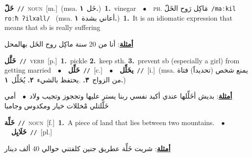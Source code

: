 \documentclass[10pt,a4paper,twoside]{article} %
\begin{document}
\begin{multicols}{2}
{\setlength\topsep{0pt}\textbf{\foreignlanguage{arabic}{خَلّ}}\ {\color{gray}\texttt{//}\color{black}}\ \textsc{noun}\ [m.]\ \color{gray}(msa. \foreignlanguage{arabic}{خَل}~\foreignlanguage{arabic}{\textbf{١.}})\color{black}\ \textbf{1.}~vinegar\ \ $\bullet$\ \ \textsc{ph.} \color{gray} \foreignlanguage{arabic}{مَاكِل رَوح الخَلّ}\color{black}\ {\color{gray}\texttt{/{\sffamily maːkil roːħ ʔilxall}/}\color{black}}\ \color{gray} (msa. \foreignlanguage{arabic}{أعاني بشدة}~\foreignlanguage{arabic}{\textbf{١.}})\color{black}\ \textbf{1.}~It is an idiomatic expression that means that sb is really suffering\  \begin{flushright}\color{gray}\foreignlanguage{arabic}{\textbf{\underline{\foreignlanguage{arabic}{أمثلة}}}: أنا من 20 سنة ماكِل روح الخَل بهالمحل}\end{flushright}\color{black}} \vspace{2mm}

{\setlength\topsep{0pt}\textbf{\foreignlanguage{arabic}{خَلَّل}}\ {\color{gray}\texttt{//}\color{black}}\ \textsc{verb}\ [p.]\ \textbf{1.}~pickle  \textbf{2.}~keep sth.  \textbf{3.}~prevent sb (especially a girl) from getting married\ \ $\bullet$\ \ \setlength\topsep{0pt}\textbf{\foreignlanguage{arabic}{خَلِّل}}\ {\color{gray}\texttt{//}\color{black}}\ [c.]\ \ $\bullet$\ \ \setlength\topsep{0pt}\textbf{\foreignlanguage{arabic}{يخَلِّل}}\ {\color{gray}\texttt{//}\color{black}}\ [i.]\ \color{gray}(msa. \foreignlanguage{arabic}{يمنع شخص (تحديداََ) فتاة من الزواج}~\foreignlanguage{arabic}{\textbf{٣.}}  .\foreignlanguage{arabic}{يحتفظ بالشيء}~\foreignlanguage{arabic}{\textbf{٢.}}  \foreignlanguage{arabic}{يُخَلِّل}~\foreignlanguage{arabic}{\textbf{١.}})\color{black}\  \begin{flushright}\color{gray}\foreignlanguage{arabic}{\textbf{\underline{\foreignlanguage{arabic}{أمثلة}}}: بديش أخَلِّلها عندي أكيد نفسي ربنا يستر عليها وتججوز وتجيب ولاد\ $\bullet$\ \  أمي خَلَّلتلي مْخللات خيار ومكدوس وجامبا}\end{flushright}\color{black}} \vspace{2mm}

{\setlength\topsep{0pt}\textbf{\foreignlanguage{arabic}{خَلِّة}}\ {\color{gray}\texttt{//}\color{black}}\ \textsc{noun}\ [f.]\ \textbf{1.}~A piece of land that lies between two mountains.\ \ $\bullet$\ \ \setlength\topsep{0pt}\textbf{\foreignlanguage{arabic}{خَلَايِل}}\ {\color{gray}\texttt{//}\color{black}}\ [pl.]\  \begin{flushright}\color{gray}\foreignlanguage{arabic}{\textbf{\underline{\foreignlanguage{arabic}{أمثلة}}}: شريت خَلِّة عطريق جنين كلفتني حوالي 40 ألف دينار}\end{flushright}\color{black}} \vspace{2mm}


\end{multicols}
\end{document}
